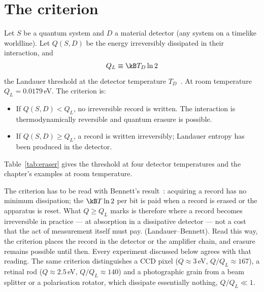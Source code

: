 \section{The criterion}\label{sec:mp_criterion}
Let $S$ be a quantum system and $D$ a material detector (any system on a timelike worldline). Let $Q(S,D)$ be the energy irreversibly dissipated in their
interaction, and
\begin{equation}
Q_L\equiv\kB T_D\ln2\label{eq:mp_QL}
\end{equation}
the Landauer threshold at the detector temperature $T_D$~\cite{Landauer1961}. At room temperature $Q_L=0.0179$\,eV. \calc{} The criterion is:
\begin{itemize}
\item If $Q(S,D)<Q_L$, no irreversible record is written. The interaction is thermodynamically reversible and quantum erasure is possible.
\item If $Q(S,D)\ge Q_L$, a record is written irreversibly; Landauer entropy has been produced in the detector.
\end{itemize}
\conjecture{} Table~\ref{tab:eraser} gives the threshold at four detector temperatures and the chapter's examples at room temperature.


The criterion has to be read with Bennett's result~\cite{Bennett1982}: acquiring a record has no minimum dissipation; the $\kB T\ln2$ per bit is paid when
a record is erased or the apparatus is reset. What $Q\ge Q_L$ marks is therefore where a record becomes irreversible in practice --- at absorption in a
dissipative detector --- not a cost that the act of measurement itself must pay. \derived{} (Landauer--Bennett). Read this way, the criterion places
the record in the detector or the amplifier chain, and erasure remains possible until then. Every experiment discussed below agrees with that reading.
\observed{} The same criterion distinguishes a CCD pixel ($Q\approx3$\,eV, $Q/Q_L\approx167$), a retinal rod ($Q\approx2.5$\,eV, $Q/Q_L\approx140$) and a
photographic grain from a beam splitter or a polarisation rotator, which dissipate essentially nothing, $Q/Q_L\ll1$. \calc

